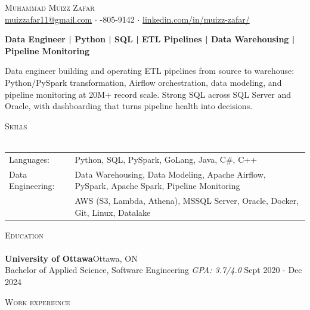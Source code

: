 \documentclass[a4paper]{article}
\newcommand{\lineunder} {
    \vspace*{-8pt} \\
    \hspace*{-18pt} \hrulefill \\
}
\newcommand{\header} [1] {
    {\hspace*{-18pt}\vspace*{6pt} \textsc{#1}}
    \vspace*{-6pt} \lineunder
}
\begin{document}
\vspace*{-40pt}

\vspace*{-10pt}
\begin{center}
	{\Huge \scshape {Muhammad Muizz Zafar}}\\
	\faSend \space \href{mailto:muizzafar11@gmail.com}{muizzafar11@gmail.com} $\cdot$ \faPhoneSquare {}-805-9142 $\cdot$ \faLinkedinSquare \space \href{https://www.linkedin.com/in/muizz-zafar/}{linkedin.com/in/muizz-zafar/}
	\\
\end{center}

\vspace{-5pt}
\begin{center}
\textbf{Data Engineer | Python | SQL | ETL Pipelines | Data Warehousing | Pipeline Monitoring}
\end{center}
\begin{center}
Data engineer building and operating ETL pipelines from source to warehouse: Python/PySpark transformation, Airflow orchestration, data modeling, and pipeline monitoring at 20M+ record scale. Strong SQL across SQL Server and Oracle, with dashboarding that turns pipeline health into decisions.
\end{center}

\header{Skills}
\begin{tabular}{ l l }
	Languages: 
& Python, SQL, PySpark, GoLang, Java, C\#, C++ \\

Data Engineering: 
& Data Warehousing, Data Modeling, Apache Airflow, PySpark, Apache Spark, Pipeline Monitoring\\
& AWS (S3, Lambda, Athena), MSSQL Server, Oracle, Docker, Git, Linux, Datalake

\end{tabular}

\header{Education}
\textbf{University of Ottawa}\hfill Ottawa, ON\\
Bachelor of Applied Science, Software Engineering \textit{GPA: 3.7/4.0} \hfill Sept 2020 - Dec 2024\\
\vspace{2mm}

\header{Work experience}
\vspace{1.5mm}
\end{document}
